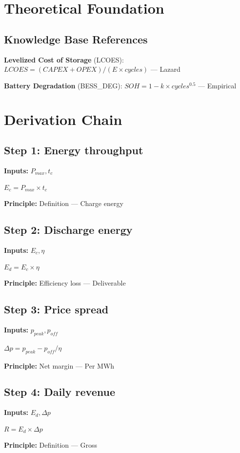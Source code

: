 \documentclass[11pt,twocolumn]{article}
\begin{document}
\section{Theoretical Foundation}

\subsection{Knowledge Base References}
\textbf{Levelized Cost of Storage} (LCOES): $LCOES = (CAPEX + OPEX)/(E \times cycles)$ --- Lazard

\textbf{Battery Degradation} (BESS_DEG): $SOH = 1 - k \times cycles^{0.5}$ --- Empirical


\section{Derivation Chain}

\subsection*{Step 1: Energy throughput}
\textbf{Inputs:} $P_{max}, t_c$

$E_c = P_{max} \times t_c$

\textbf{Principle:} Definition --- Charge energy

\subsection*{Step 2: Discharge energy}
\textbf{Inputs:} $E_c, \eta$

$E_d = E_c \times \eta$

\textbf{Principle:} Efficiency loss --- Deliverable

\subsection*{Step 3: Price spread}
\textbf{Inputs:} $p_{peak}, p_{off}$

$\Delta p = p_{peak} - p_{off}/\eta$

\textbf{Principle:} Net margin --- Per MWh

\subsection*{Step 4: Daily revenue}
\textbf{Inputs:} $E_d, \Delta p$

$R = E_d \times \Delta p$

\textbf{Principle:} Definition --- Gross
\end{document}

